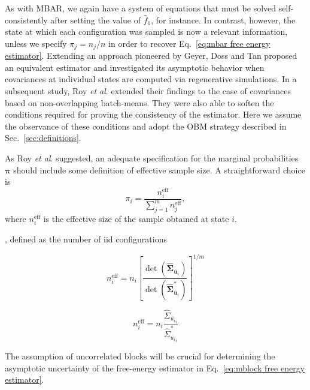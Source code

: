 \documentclass[aip,jcp,reprint,amsmath,amssymb]{revtex4-1}
\newcommand{\mt}[1]{\boldsymbol{\mathbf{#1}}}           %
\newcommand{\vt}[1]{\boldsymbol{\mathbf{#1}}}           %
\begin{document}
As with MBAR, we again have a system of equations that must be solved self-consistently after setting the value of $\hat f_1$, for instance. In contrast, however, the state at which each configuration was sampled is now a relevant information, unless we specify $\pi_j = {n_j}/{n}$ in order to recover Eq.~\eqref{eq:mbar free energy estimator}. Extending an approach pioneered by Geyer,\cite{Geyer_1994} Doss and Tan\cite{Doss_2014} proposed an equivalent estimator and investigated its asymptotic behavior when covariances at individual states are computed via regenerative simulations. In a subsequent study, Roy \textit{et al}.\cite{Roy_2018} extended their findings to the case of covariances based on non-overlapping batch-means. They were also able to soften the conditions required for proving the consistency of the estimator. Here we assume the observance of these conditions and adopt the OBM strategy described in Sec.~\ref{sec:definitions}. 

As Roy \textit{et al}.\cite{Roy_2018} suggested, an adequate specification for the marginal probabilities $\vt \pi$ should include some definition of effective sample size. A straightforward choice is
\begin{equation}
\label{eq:mblock prior}
\pi_i = \frac{n^\text{eff}_i}{\sum_{j=1}^m n^\text{eff}_j},
\end{equation}
where $n^\text{eff}_i$ is the effective size of the sample obtained at state $i$.

, defined as the number of iid configurations 

\begin{equation*}
n^\text{eff}_i = n_i \left[\frac{\det(\hat{\mt \Sigma}_{\overline{\vt u}_i})}{\det(\hat{\mt \Sigma}^\ast_{\overline{\vt u}_i})}\right]^{1/m}
\end{equation*}

\begin{equation*}
n^\text{eff}_i = n_i \frac{\hat{\Sigma}_{\overline{u_i}_i}}{\hat{\Sigma}^\ast_{\overline{u_i}_i}}
\end{equation*}

The assumption of uncorrelated blocks will be crucial for determining the asymptotic uncertainty of the free-energy estimator in Eq.~\eqref{eq:mblock free energy estimator}.
\end{document}
